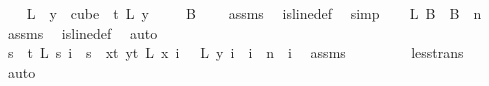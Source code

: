 \begin{isabellebody}
\ \ \isamarkupfalse%
\ {\isacharquery}{\kern0pt}L\ {\isacharequal}{\kern0pt}\ {\isachardoublequoteopen}{\isacharparenleft}{\kern0pt}{\isasymlambda}y\ {\isasymin}\ cube\ {}\ t{\isachardot}{\kern0pt}\ L\ {\isacharparenleft}{\kern0pt}y\ {}{\isacharparenright}{\kern0pt}{\isacharparenright}{\kern0pt}{\isachardoublequoteclose}\isanewline
\ \ \isamarkupfalse%
\ {\isachardoublequoteopen}{\isacharquery}{\kern0pt}B{}\ {\isasymnoteq}\ {\isacharbraceleft}{\kern0pt}{\isacharbraceright}{\kern0pt}{\isachardoublequoteclose}\ \isamarkupfalse%
\ assms{\isacharparenleft}{\kern0pt}{}{\isacharparenright}{\kern0pt}\ \isamarkupfalse%
\ is{\isacharunderscore}{\kern0pt}line{\isacharunderscore}{\kern0pt}def\ \isamarkupfalse%
\ simp\isanewline
\isanewline
\ \ \isamarkupfalse%
\ L{}{\isacharcolon}{\kern0pt}\ {\isachardoublequoteopen}{\isacharquery}{\kern0pt}B{}\ {\isasymunion}\ {\isacharquery}{\kern0pt}B{}\ {\isacharequal}{\kern0pt}\ {\isacharbraceleft}{\kern0pt}{\isachardot}{\kern0pt}{\isachardot}{\kern0pt}{\isacharless}{\kern0pt}n{\isacharbraceright}{\kern0pt}{\isachardoublequoteclose}\ \isamarkupfalse%
\ assms{\isacharparenleft}{\kern0pt}{}{\isacharparenright}{\kern0pt}\ \isamarkupfalse%
\ is{\isacharunderscore}{\kern0pt}line{\isacharunderscore}{\kern0pt}def\ \isamarkupfalse%
\ auto\isanewline
\ \ \isacommand{{\isacharbraceleft}{\kern0pt}}\isamarkupfalse%
\isanewline
\ \ \ \ \isamarkupfalse%
\ {\isachardoublequoteopen}{\isacharparenleft}{\kern0pt}{\isasymforall}s\ {\isacharless}{\kern0pt}\ t{\isachardot}{\kern0pt}\ L\ s\ i\ {\isacharequal}{\kern0pt}\ s{\isacharparenright}{\kern0pt}\ {\isasymlongrightarrow}\ {\isasymnot}{\isacharparenleft}{\kern0pt}{\isasymforall}x{\isacharless}{\kern0pt}t{\isachardot}{\kern0pt}\ {\isasymforall}y{\isacharless}{\kern0pt}t{\isachardot}{\kern0pt}\ L\ x\ i\ {\isacharequal}{\kern0pt}\ \ L\ y\ i{\isacharparenright}{\kern0pt}{\isachardoublequoteclose}\ \ {\isachardoublequoteopen}i\ {\isacharless}{\kern0pt}\ n{\isachardoublequoteclose}\ \ i\ \isamarkupfalse%
\ assms{\isacharparenleft}{\kern0pt}{}{\isacharparenright}{\kern0pt}\ \isanewline
\ \ \ \ \ \ \isamarkupfalse%
\ less{\isacharunderscore}{\kern0pt}trans\ \isamarkupfalse%
\ auto\ \isanewline
\ \ \ \ \isamarkupfalse%
\ \isamarkupfalse%

\end{isabellebody}
